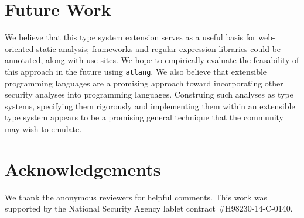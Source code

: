 \documentclass[9pt]{sig-alternate}
\theoremstyle{definition}
\begin{document}

\section{Future Work}

We believe that this type system extension serves as a useful basis for web-oriented static analysis;
frameworks and regular expression libraries could be annotated, along with use-sites. We hope to empirically evaluate the feasability of this approach in the future using \verb|atlang|. 
%
We also believe that extensible programming languages are a promising approach toward incorporating other security
 analyses into programming languages. Construing such analyses as type systems, specifying them rigorously and implementing them within an extensible type system appears to be a promising general technique that the community may wish to emulate.
%



\section{Acknowledgements}
We thank the anonymous reviewers for helpful comments.
This work was supported by the National Security Agency
lablet contract \#H98230-14-C-0140.
\end{document}
